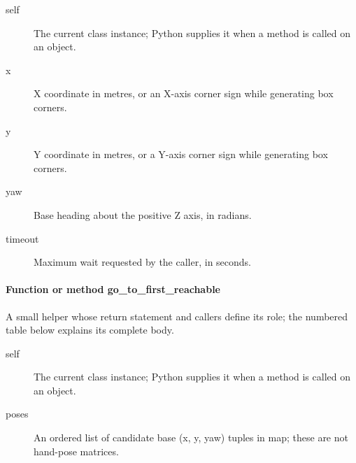 \documentclass[11pt,a4paper]{book}
\begin{document}
\begin{description}
\item[self] The current class instance; Python supplies it when a method is called on an object.
\item[x] X coordinate in metres, or an X-axis corner sign while generating box corners.
\item[y] Y coordinate in metres, or a Y-axis corner sign while generating box corners.
\item[yaw] Base heading about the positive Z axis, in radians.
\item[timeout] Maximum wait requested by the caller, in seconds.
\end{description}

\paragraph{Function or method go\_to\_first\_reachable}
A small helper whose return statement and callers define its role; the numbered table below explains its complete body.

\begin{description}
\item[self] The current class instance; Python supplies it when a method is called on an object.
\item[poses] An ordered list of candidate base (x, y, yaw) tuples in map; these are not hand-pose matrices.
\end{description}
\end{document}
